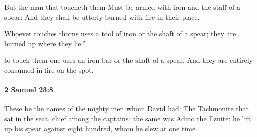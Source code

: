 			\begin{versebox}
					\item[BHS] 
					\item[ASV] But the man that toucheth them Must be armed with iron and the staff of a spear: And they shall be utterly burned with fire in their place.
					\item[NIV] Whoever touches thorns uses a tool of iron or the shaft of a spear; they are burned up where they lie.”
					\item[NRSV] to touch them one uses an iron bar or the shaft of a spear. And they are entirely consumed in fire on the spot.
			\end{versebox}

		\paragraph{2 Samuel 23:8} %
			\label{2SAMUEL-23-8}

			These be the names of the mighty men whom David had: The Tachmonite that sat in the seat, chief among the captains; the same was Adino the Eznite: he lift up his spear against eight hundred, whom he slew at one time.

